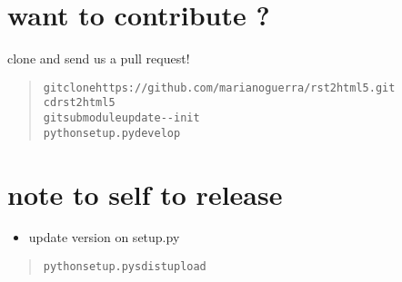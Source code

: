 \documentclass[a4paper]{article}
\begin{document}
\section{want to contribute ?%
  \label{want-to-contribute}%
}

clone and send us a pull request!

\begin{quote}
\begin{alltt}
git clone https://github.com/marianoguerra/rst2html5.git
cd rst2html5
git submodule update -{}-init
python setup.py develop
\end{alltt}
\end{quote}


\section{note to self to release%
  \label{note-to-self-to-release}%
}

\begin{itemize}
\item update version on setup.py
\end{itemize}

\begin{quote}
\begin{alltt}
python setup.py sdist upload
\end{alltt}
\end{quote}
\end{document}
